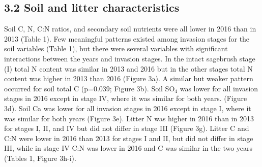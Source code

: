 \documentclass[
  11pt,
  a4paper,
]{article}
\begin{document}
\hypertarget{soil-and-litter-characteristics}{%
\subsection{3.2 Soil and litter characteristics}\label{soil-and-litter-characteristics}}

Soil C, N, C:N ratios, and secondary soil nutrients were all lower in 2016 than in 2013 (Table 1). Few meaningful patterns existed among invasion stages for the soil variables (Table 1), but there were several variables with significant interactions between the years and invasion stages. In the intact sagebrush stage (I) total N content was similar in 2013 and 2016 but in the other stages total N content was higher in 2013 than 2016 (Figure 3a). A similar but weaker pattern occurred for soil total C (p=0.039; Figure 3b). Soil SO\(_4\) was lower for all invasion stages in 2016 except in stage IV, where it was similar for both years. (Figure 3d). Soil Ca was lower for all invasion stages in 2016 except in stage I, where it was similar for both years (Figure 3e). Litter N was higher in 2016 than in 2013 for stages I, II, and IV but did not differ in stage III (Figure 3g). Litter C and C:N were lower in 2016 than 2013 for stages I and II, but did not differ in stage III, while in stage IV C:N was lower in 2016 and C was similar in the two years (Tables 1, Figure 3h-i).
\end{document}
